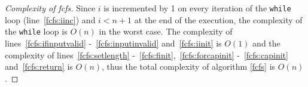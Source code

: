 \begin{proof}[Complexity of fcfs]
   Since $i$ is incremented by 1 on every iteration of the \texttt{while} loop (line~\ref{fcfs:iinc}) and $i < n+1$ at the
   end of the execution, the complexity of the \texttt{while} loop is $O\left(n\right)$ in the worst case. The complexity of
   lines~\ref{fcfs:ifinputvalid} -~\ref{fcfs:inputinvalid} and~\ref{fcfs:iinit} is $O\left(1\right)$ and the complexity of
   lines~\ref{fcfs:setlength} -~\ref{fcfs:finit},~\ref{fcfs:forcapinit} -~\ref{fcfs:capinit} and~\ref{fcfs:return} is
   $O\left(n\right)$, thus the total complexity of algorithm \ref{fcfs} is $O\left(n\right)$.
\end{proof}
